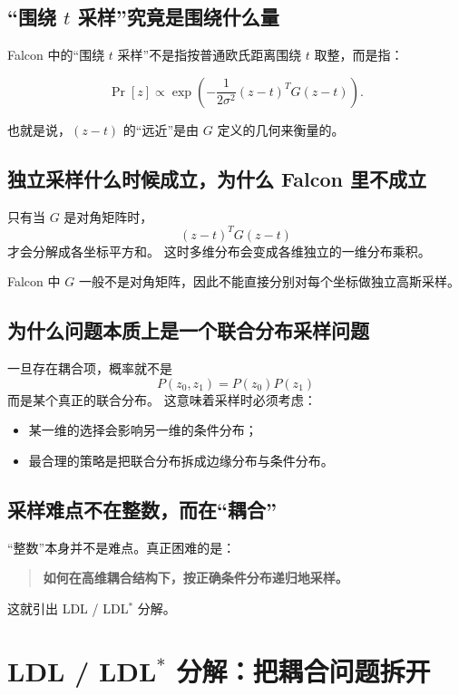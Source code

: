 \documentclass[11pt,a4paper]{ctexart}
\begin{document}
\subsection{“围绕 \(t\) 采样”究竟是围绕什么量}

Falcon 中的“围绕 \(t\) 采样”不是指按普通欧氏距离围绕 \(t\) 取整，而是指：

\[
\Pr[z]\propto \exp\!\left(-\frac{1}{2\sigma^2}(z-t)^T G (z-t)\right).
\]

也就是说，\((z-t)\) 的“远近”是由 \(G\) 定义的几何来衡量的。

\subsection{独立采样什么时候成立，为什么 Falcon 里不成立}

只有当 \(G\) 是对角矩阵时，
\[
(z-t)^T G (z-t)
\]
才会分解成各坐标平方和。  
这时多维分布会变成各维独立的一维分布乘积。

Falcon 中 \(G\) 一般不是对角矩阵，因此不能直接分别对每个坐标做独立高斯采样。

\subsection{为什么问题本质上是一个联合分布采样问题}

一旦存在耦合项，概率就不是
\[
P(z_0,z_1)=P(z_0)P(z_1)
\]
而是某个真正的联合分布。  
这意味着采样时必须考虑：

\begin{itemize}
    \item 某一维的选择会影响另一维的条件分布；
    \item 最合理的策略是把联合分布拆成边缘分布与条件分布。
\end{itemize}

\subsection{采样难点不在整数，而在“耦合”}

“整数”本身并不是难点。真正困难的是：

\begin{quote}
\textbf{如何在高维耦合结构下，按正确条件分布递归地采样。}
\end{quote}

这就引出 LDL / LDL\(^*\) 分解。

\section{LDL / LDL\(^*\) 分解：把耦合问题拆开}
\end{document}

